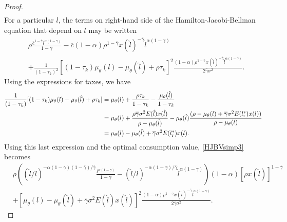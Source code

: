 \documentclass[11pt]{article}
\theoremstyle{plain}
\begin{document}
\begin{proof}
\begin{align*}
\end{align*}
For a particular $l$, the terms on right-hand side of the Hamilton-Jacobi-Bellman equation that depend on $l$ may be written 
\begin{equation}
\begin{aligned}%
& \rho \frac{\overline{c}^{1-\overline{\gamma}}l^{\alpha(1-\gamma)}}{1-\gamma} - \overline{c}(1-\alpha)\rho^{1-\overline{\gamma}} x(\hat{l})^{-\overline{\gamma}}\hat{l}^{\alpha(1-\gamma)}
\\ & + \frac{1}{(1-\tau_k)^2}{\left[(1 - \tau_k)\mu_{\theta}(l) - \mu_{\theta}(\hat{l}) + \rho\tau_k\right]}^2 \frac{(1-\alpha)\rho^{1-\overline{\gamma}} x(\hat{l})^{-\overline{\gamma}}\hat{l}^{\alpha(1-\gamma)}}{2\overline{\gamma}\sigma^2}.
\end{aligned}
\label{HJBVsimp3}
\end{equation}
Using the expressions for taxes, we have 
\begin{align*}
\frac{1}{(1-\tau_k)}[(1 - \tau_k)\mu_{\theta}(l) - \mu_{\theta}(\hat{l}) + \rho\tau_k] & = \mu_{\theta}(l) + \frac{\rho\tau_k}{1-\tau_k} - \frac{\mu_{\theta}(\hat{l}) }{1-\tau_k}
\\ & = \mu_{\theta}(l) + \frac{\rho\overline{\gamma}\sigma^2E(\hat{l})x(\hat{l})}{\rho - \mu_{\theta}(\hat{l})}
 - \mu_{\theta}(\hat{l}) \frac{(\rho - \mu_{\theta}(l) + \overline{\gamma}\sigma^2E(l_{\textnormal{r}}^*)x(l))}{\rho - \mu_{\theta}(l)}
\\ & = \mu_{\theta}(l) - \mu_{\theta}(\hat{l}) + \overline{\gamma}\sigma^2E(l_{\textnormal{r}}^*)x(l).
\end{align*}
Using this last expression and the optimal consumption value, \eqref{HJBVsimp3} becomes
\begin{equation}
\begin{aligned}
& \rho{\left((\hat{l}/l)^{-\alpha(1-\gamma)(1-\overline{\gamma})/\overline{\gamma}}
\frac{l^{\alpha(1-\gamma)}}{1-\overline{\gamma}}  - (\hat{l}/l)^{-\alpha(1-\gamma)/\overline{\gamma}}\hat{l}^{\alpha(1-\gamma)}\right)}(1-\alpha)[\rho x(\hat{l})]^{1-\overline{\gamma}}
\\ & + {\left[\mu_{\theta}(l) - \mu_{\theta}(\hat{l}) +  \overline{\gamma}\sigma^2 E(\hat{l}) x(\hat{l})\right]}^2 \frac{(1-\alpha) \rho^{1-\overline{\gamma}} x(\hat{l})^{-\overline{\gamma}} \hat{l}^{\alpha(1-\gamma)}}{2\overline{\gamma}\sigma^2}.
\end{aligned}

\end{equation}
\end{proof}
\end{document}
